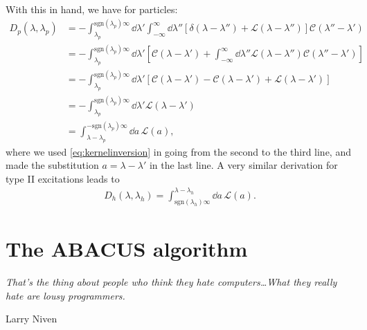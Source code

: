 \documentclass[11pt, a4paper]{report} %
\newcommand{\inversetruncc}{\mathcal{L}}
\newcommand{\kernel}{\mathcal{C}}
\begin{document}
With this in hand, we have for particles:
\begin{align}
	D_p(\lambda, \lambda_p) &= - \int_{\lambda_p}^{\textrm{sgn}(\lambda_p)\infty} \dd \lambda' \int_{-\infty}^{\infty} \dd  \lambda'' \left[\delta(\lambda-\lambda'') + \inversetruncc(\lambda-\lambda'') \right]\kernel(\lambda''-\lambda')\\
	&= - \int_{\lambda_p}^{\textrm{sgn}(\lambda_p)\infty} \dd \lambda' \left[\kernel(\lambda-\lambda') + \int_{-\infty}^{\infty} \dd  \lambda'' \inversetruncc(\lambda-\lambda'') \kernel(\lambda''-\lambda')\right]\\
	&= - \int_{\lambda_p}^{\textrm{sgn}(\lambda_p)\infty} \dd \lambda' \left[\kernel(\lambda-\lambda') - \kernel(\lambda-\lambda') + \inversetruncc(\lambda-\lambda')\right]\\
	&= - \int_{\lambda_p}^{\textrm{sgn}(\lambda_p)\infty} \dd \lambda' \inversetruncc(\lambda-\lambda')\\
	&=  \int_{\lambda-\lambda_p}^{-\textrm{sgn}(\lambda_p)\infty} \dd a \, \inversetruncc(a),
\end{align}
where we used \cref{eq:kernelinversion} in going from the second to the third line, and made the substitution \(a = \lambda-\lambda'\) in the last line.
A very similar derivation for type II excitations leads to
\begin{align}
	D_h(\lambda,\lambda_h) = \int_{\textrm{sgn}(\lambda_h)\infty}^{\lambda-\lambda_h} \dd a\, \inversetruncc(a).
\end{align}




\chapter{The ABACUS algorithm}\label{chap:abacus}

\epigraph{\textit{That's the thing about people who think they hate computers\ldots What they really hate are lousy programmers.}}{Larry Niven}
\end{document}
